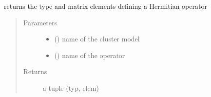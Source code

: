 \documentclass[letterpaper,10pt,english]{sphinxmanual}
\begin{document}
\begin{fulllineitems}
\label{\detokenize{functions:pyqcm.matrix_elements}}
\sphinxAtStartPar
returns the type and matrix elements defining a Hermitian operator
\begin{quote}\begin{description}
\item[{Parameters}] \leavevmode\begin{itemize}
\item {} 
\sphinxAtStartPar
{} () \textendash{} name of the cluster model

\item {} 
\sphinxAtStartPar
{} () \textendash{} name of the operator

\end{itemize}

\item[{Returns}] \leavevmode
\sphinxAtStartPar
a tuple (typ, elem)

\end{description}\end{quote}

\end{fulllineitems}

\end{document}
